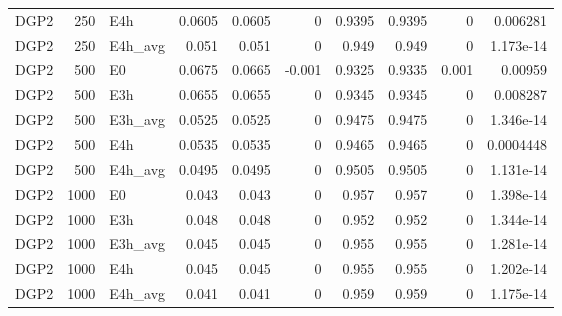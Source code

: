 \begin{table}[!htbp]
{\begin{tabular}{lrlrrrrrrr}
DGP2 & 250 & E4h & 0.0605 & 0.0605 & 0 & 0.9395 & 0.9395 & 0 & 0.006281 \\
DGP2 & 250 & E4h_avg & 0.051 & 0.051 & 0 & 0.949 & 0.949 & 0 & 1.173e-14 \\
DGP2 & 500 & E0 & 0.0675 & 0.0665 & -0.001 & 0.9325 & 0.9335 & 0.001 & 0.00959 \\
DGP2 & 500 & E3h & 0.0655 & 0.0655 & 0 & 0.9345 & 0.9345 & 0 & 0.008287 \\
DGP2 & 500 & E3h_avg & 0.0525 & 0.0525 & 0 & 0.9475 & 0.9475 & 0 & 1.346e-14 \\
DGP2 & 500 & E4h & 0.0535 & 0.0535 & 0 & 0.9465 & 0.9465 & 0 & 0.0004448 \\
DGP2 & 500 & E4h_avg & 0.0495 & 0.0495 & 0 & 0.9505 & 0.9505 & 0 & 1.131e-14 \\
DGP2 & 1000 & E0 & 0.043 & 0.043 & 0 & 0.957 & 0.957 & 0 & 1.398e-14 \\
DGP2 & 1000 & E3h & 0.048 & 0.048 & 0 & 0.952 & 0.952 & 0 & 1.344e-14 \\
DGP2 & 1000 & E3h_avg & 0.045 & 0.045 & 0 & 0.955 & 0.955 & 0 & 1.281e-14 \\
DGP2 & 1000 & E4h & 0.045 & 0.045 & 0 & 0.955 & 0.955 & 0 & 1.202e-14 \\
DGP2 & 1000 & E4h_avg & 0.041 & 0.041 & 0 & 0.959 & 0.959 & 0 & 1.175e-14 \\
\bottomrule
\end{tabular}
}
\end{table}
